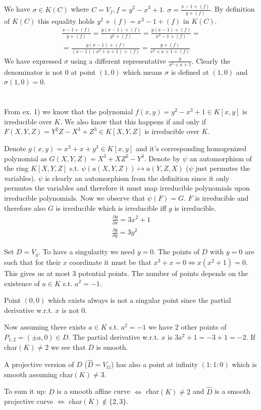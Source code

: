 \documentclass[12pt, a4paper]{article}
\begin{document}
\section{}
We have $\sigma \in K(C)$ where $C = V_f, f = y^2-x^3+1$. $\sigma = \frac{x-1+(f)}{y+(f)}$. By definition of $K(C)$ this equality holds $y^2+(f)=x^3-1+(f)$ in $K(C)$.
\begin{gather*}
\frac{x-1+(f)}{y+(f)} = \frac{y(x-1)+(f)}{y^2+(f)} = \frac{y(x-1)+(f)}{x^3-1+(f)} = \\
=\frac{y(x-1)+(f)}{(x-1)(x^2+x+1)+(f)} = \frac{y + (f)}{x^2+x+1+(f)}
\end{gather*}
We have expressed $\sigma$ using a different representative $\frac{y}{x^2+x+1}$. Clearly the denominator is not $0$ at point $(1,0)$ which means $\sigma$ is defined at $(1,0)$ and $\sigma(1,0)=0$.

\section{}
From ex. 1) we know that the polynomial $f(x,y) = y^2-x^3+1 \in K[x,y]$ is irreducible over $K$. We also know that this happens if and only if $F(X,Y,Z) = Y^2Z-X^3+Z^3 \in K[X,Y,Z]$ is irreducible over $K$. 

Denote $g(x,y) = x^3+x+y^3 \in K[x,y]$ and it's corresponding homogenized polynomial as $G(X,Y,Z) = X^3+XZ^2-Y^3$. Denote by $\psi$ an automorphism of the ring $K[X,Y,Z]$ s.t. $\psi(a(X,Y,Z)) \mapsto a(Y,Z,X)$ ($\psi$ just permutes the variables). $\psi$ is clearly an automorphism from the definition since it only permutes the variables and therefore it must map irreducible polynomials upon irreducible polynomials. Now we observe that $\psi(F) = G$. $F$ is irreducible and therefore also $G$ is irreducible which is irreducible iff $g$ is irreducible.
\begin{gather*}
\frac{\partial g}{\partial x} = 3x^2+1\\
\frac{\partial g}{\partial y} = 3y^2
\end{gather*}

Set $D=V_g$. To have a singularity we need $y=0$. The points of $D$ with $y=0$ are such that for their $x$ coordinate it must be that $x^3+x=0 \iff x(x^2+1)=0$. This gives us at most 3 potential points. The number of points depends on the existence of $a \in K$ s.t. $a^2 = -1$. 

Point $(0,0)$ which exists always is not a singular point since the partial derivative w.r.t. $x$ is not $0$.

Now assuming there exists $a \in K$ s.t. $a^2=-1$ we have $2$ other points of $P_{1,2}=(\pm a, 0) \in D$. The partial derivative w.r.t. $x$ is $3a^2+1 = -3+1 = -2$. If char$(K)\neq 2$ we see that $D$ is smooth.

A projective version of $D$ ($\hat{D} = V_G$) has also a point at infinity $(1:1:0)$ which is smooth assuming char$(K)\neq 3$.

To sum it up: $D$ is a smooth affine curve $\iff$ char$(K) \neq 2$ and $\hat{D}$ is a smooth projective curve $\iff$ char$(K)\notin \{2,3\}$.
\end{document}
